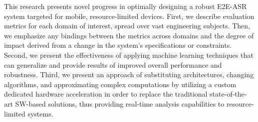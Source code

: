 This research presents novel progress in optimally designing 
a robust E2E-ASR system
targeted for mobile, 
resource-limited devices. 
First, we describe evaluation metrics for each domain of interest, 
spread over vast engineering subjects. 
Then, we emphasize any bindings between the metrics 
across domains and the degree of impact 
derived from a change in the system's specifications or constraints. 
Second, we present the effectiveness
of applying machine learning techniques 
that can generalize and provide results 
of improved overall performance and robustness.
Third, we present an approach of substituting
architectures, changing algorithms,
and approximating complex computations
by utilizing 
a custom dedicated hardware acceleration 
in order to replace the 
traditional state-of-the-art SW-based 
solutions, thus providing real-time 
analysis capabilities to resource-limited systems.

